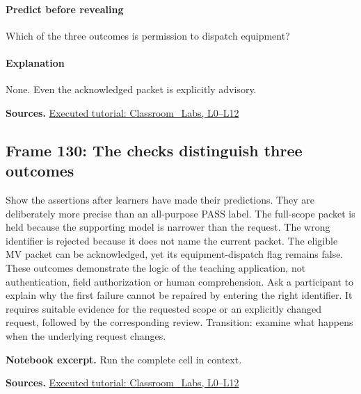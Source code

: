 \documentclass[11pt]{article}
\newcommand{\Code}[1]{}
\begin{document}
\paragraph{Predict before revealing}Which of the three outcomes is permission to dispatch equipment?
\paragraph{Explanation}None. Even the acknowledged packet is explicitly advisory.
\par\nopagebreak\begin{minipage}{\linewidth}{\footnotesize\color{slate}\textbf{Sources.} \href{../Classroom_Labs.html}{Executed tutorial: Classroom\_Labs, L0--L12}\par}\end{minipage}\par\medskip
\subsection*{Frame 130: The checks distinguish three outcomes}
Show the assertions after learners have made their predictions. They are deliberately more precise than an all-purpose PASS label. The full-scope packet is held because the supporting model is narrower than the request. The wrong identifier is rejected because it does not name the current packet. The eligible MV packet can be acknowledged, yet its equipment-dispatch flag remains false. These outcomes demonstrate the logic of the teaching application, not authentication, field authorization or human comprehension. Ask a participant to explain why the first failure cannot be repaired by entering the right identifier. It requires suitable evidence for the requested scope or an explicitly changed request, followed by the corresponding review. Transition: examine what happens when the underlying request changes.\par
\par\noindent\begin{minipage}{\linewidth}\textbf{Notebook excerpt.} Run the complete cell in context.\par \Code{O06.py}\end{minipage}\par
\par\nopagebreak\begin{minipage}{\linewidth}{\footnotesize\color{slate}\textbf{Sources.} \href{../Classroom_Labs.html}{Executed tutorial: Classroom\_Labs, L0--L12}\par}\end{minipage}\par\medskip
\end{document}
